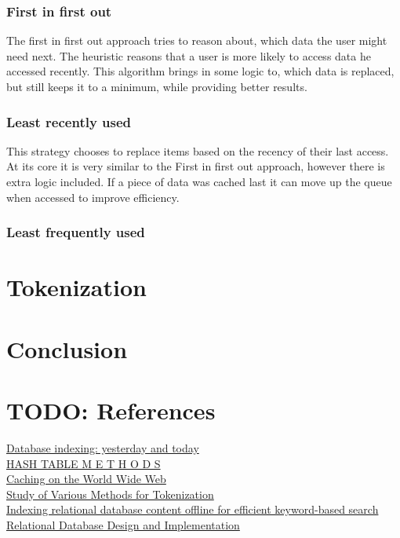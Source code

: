 \documentclass[10pt,a4paper]{article}
\begin{document}
\subsubsection{First in first out}
The first in first out approach tries to reason about, which data the user might need next. The heuristic reasons that a user is more likely to access data he accessed recently. This algorithm brings in some logic to, which data is replaced, but still keeps it to a minimum, while providing better results.

\subsubsection{Least recently used}
This strategy chooses to replace items based on the recency of their last access. At its core it is very similar to the First in first out approach, however there is extra logic included. If a piece of data was cached last it can move up the queue when accessed to improve efficiency.

\subsubsection{Least frequently used}

\section{Tokenization}


\section{Conclusion}


\section*{TODO: References}
\href{https://citeseerx.ist.psu.edu/pdf/24ad3ea19602f0737807cb05fafe44c6c2f86aaf}{Database indexing: yesterday and today}\\
\href{https://dl.acm.org/doi/pdf/10.1145/356643.356645}{HASH TABLE M E T H O D S}\\
\href{https://ieeexplore.ieee.org/abstract/document/755618?casa_token=1dPMFNh1uOMAAAAA:EhTd5TzTa1RHsWQThUec5nDGgAe82xXTYaG32s8GsTNty9qoUoSPlu0Rzh-it8kQ-qtl19_LX-0KjA}{Caching on the World Wide Web}\\
\href{https://link.springer.com/chapter/10.1007/978-981-15-6198-6_18}{Study of Various Methods for Tokenization}\\
\href{https://ieeexplore.ieee.org/abstract/document/1540920?casa_token=hzg5FRuCiVQAAAAA:MDNu1j1gc-DR7xTkOo22jTVIlq55BcYoatyx97bKzY3HdvAw_7-4sRhCNF-iXQcbZQTw2Bb3u0YQxg}{Indexing relational database content offline for efficient keyword-based search}
\href{https://books.google.sk/books?hl=en&lr=&id=yQgfCgAAQBAJ&oi=fnd&pg=PP1&dq=relational+database&ots=qPKwl0TFYt&sig=6jOwNojMeS_JzJYt9NTVB7_gJwk&redir_esc=y#v=onepage&q=relational%20database&f=false}{Relational Database Design and Implementation}




\end{document}

